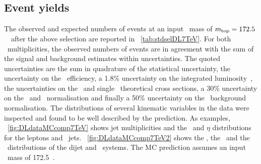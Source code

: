 \subsection{Event yields}
\label{sect:evtyields7TeV}
The observed and expected numbers of events at an input \tquark\ mass of $m_{\mathrm{top}}=172.5$~\GeV\ after the above selection are reported in \tab~\ref{tab:stdselDL7TeV}. 
%
For both \btag\ multiplicities, the observed numbers of events are in agreement with the sum of the signal and background estimates within uncertainties. 
%
The quoted uncertainties are the sum in quadrature of the statistical uncertainty, the uncertainty on the \btag\ efficiency, a 1.8\% uncertainty on the integrated luminosity~\cite{Aad:2013ucp}, the uncertainties on the \ttbar\ and single \tquark\ theoretical cross sections, a 30\% uncertainty on the \Wj\ and \Zj\ normalisation and finally a 50\% uncertainty on the \fake\ background normalisation.
% 
The distributions of several kinematic variables in the data were inspected and found to be well described by the prediction.
%
As examples, \fig~\ref{fig:DLdataMCcomp7TeV} shows jet multiplicities and the \pt\ and $\eta$ distributions for the leptons and \btagged\ jets. \Fig~\ref{fig:DLdataMCcomp7TeV2} shows the \met, the \mlbr\ and the \pt\ distributions of the dijet and \dil\ systems. 
%
The \gls{MC} prediction assumes an input \tquark\ mass of 172.5~\GeV. 
%
